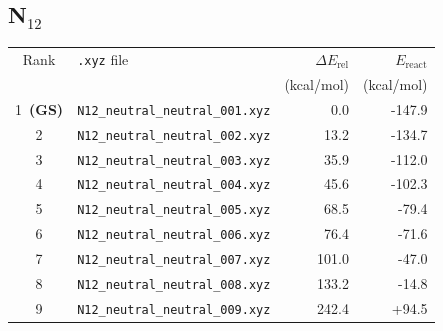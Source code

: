 \documentclass[11pt,a4paper]{article}
\begin{document}
\subsection*{N$_{12}$}
\begin{longtable}{clrr}
\toprule
Rank & \texttt{.xyz} file & $\Delta E_\text{rel}$ & $E_\text{react}$ \\
 & & (kcal/mol) & (kcal/mol) \\
\midrule\endhead
\rowcolor{gs}1~\textbf{(GS)} & \texttt{N12\_neutral\_neutral\_001.xyz} & 0.0 & -147.9 \\
2 & \texttt{N12\_neutral\_neutral\_002.xyz} & 13.2 & -134.7 \\
3 & \texttt{N12\_neutral\_neutral\_003.xyz} & 35.9 & -112.0 \\
4 & \texttt{N12\_neutral\_neutral\_004.xyz} & 45.6 & -102.3 \\
5 & \texttt{N12\_neutral\_neutral\_005.xyz} & 68.5 & -79.4 \\
6 & \texttt{N12\_neutral\_neutral\_006.xyz} & 76.4 & -71.6 \\
7 & \texttt{N12\_neutral\_neutral\_007.xyz} & 101.0 & -47.0 \\
8 & \texttt{N12\_neutral\_neutral\_008.xyz} & 133.2 & -14.8 \\
9 & \texttt{N12\_neutral\_neutral\_009.xyz} & 242.4 & +94.5 \\
\bottomrule
\end{longtable}
\end{document}
